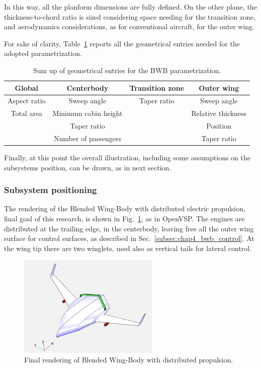 In this way, all the planform dimensions are fully defined. 
On the other plane, the thickness-to-chord ratio is sized considering space needing for the transition zone, and aerodynamics considerations, as for conventional aircraft, for the outer wing. 

For sake of clarity, Table~\ref{tab:bwb_geom_input_sum_up} reports all the geometrical entries needed for the adopted parametrization. 
\begin{table}[!h]
	\centering
	\begin{tabular}{c c c c}
		\hline
		\textbf{Global} & \textbf{Centerbody} & \textbf{Transition zone} & \textbf{Outer wing} \\
		\hline
		Aspect ratio & Sweep angle & Taper ratio & Sweep angle \\
		Total area & Minimum cabin height & & Relative thickness \\
		& Taper ratio & & Position \\
		& Number of passengers & & Taper ratio \\
		\hline 
	\end{tabular}
	\caption{Sum up of geometrical entries for the BWB parametrization.}
	\label{tab:bwb_geom_input_sum_up}
\end{table}

Finally, at this point the overall illustration, including some assumptions on the subsystems position, can be drawn, as in next section.

\subsubsection{Subsystem positioning}
\label{subsubsec:chap4_bwb_subsystem_position}

The rendering of the Blended Wing-Body with distributed electric propulsion, final goal of this research, is shown in Fig.~\ref{fig:bwb_dep_render}, as in OpenVSP. 
The engines are distributed at the trailing edge, in the centerbody, leaving free all the outer wing surface for control surfaces, as described in Sec.~\ref{subsec:chap4_bwb_control}. 
At the wing tip there are two winglets, used also as vertical tails for lateral control. 
\begin{figure}[!h]
	\centering
	\includegraphics[keepaspectratio, width=0.6\textwidth]{images/chap4/bwb_dep_render.jpg}
	\caption{Final rendering of Blended Wing-Body with distributed propulsion.}
	\label{fig:bwb_dep_render}
\end{figure}

